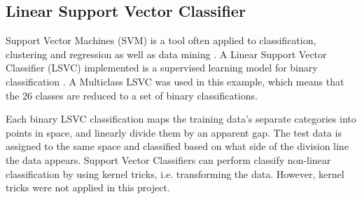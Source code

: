 \documentclass[../main.tex]{subfiles}
\begin{document}
\subsection{Linear Support Vector Classifier}
Support Vector Machines (SVM) is a tool often applied to classification, clustering and regression \cite{svm1} as well as data mining \cite{svn_dm}. A Linear Support Vector Classifier (LSVC) implemented is a supervised learning model for binary classification \cite{svm}. A Multiclass LSVC was used in this example, which means that the 26 classes are reduced to a set of binary classifications.

Each binary LSVC classification maps the training data's separate categories into points in space, and linearly divide them by an apparent gap. The test data is assigned to the same space and classified based on what side of the division line the data appears. Support Vector Classifiers can perform classify non-linear classification by using kernel tricks, i.e. transforming the data. However, kernel tricks were not applied in this project.
\end{document}

